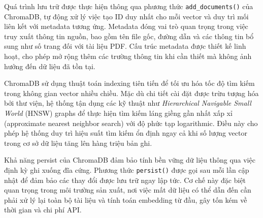 Quá trình lưu trữ được thực hiện thông qua phương thức \texttt{add\_documents()} của ChromaDB, tự động xử lý việc tạo ID duy nhất cho mỗi vector và duy trì mối liên kết với metadata tương ứng. Metadata đóng vai trò quan trọng trong việc truy xuất thông tin nguồn, bao gồm tên file gốc, đường dẫn và các thông tin bổ sung như số trang đối với tài liệu PDF. Cấu trúc metadata được thiết kế linh hoạt, cho phép mở rộng thêm các trường thông tin khi cần thiết mà không ảnh hưởng đến dữ liệu đã tồn tại.

ChromaDB sử dụng thuật toán indexing tiên tiến để tối ưu hóa tốc độ tìm kiếm trong không gian vector nhiều chiều. Mặc dù chi tiết cài đặt được trừu tượng hóa bởi thư viện, hệ thống tận dụng các kỹ thuật như \emph{Hierarchical Navigable Small World} (HNSW) graphs để thực hiện tìm kiếm láng giềng gần nhất xấp xỉ (approximate nearest neighbor search) với độ phức tạp logarithmic. Điều này cho phép hệ thống duy trì hiệu suất tìm kiếm ổn định ngay cả khi số lượng vector trong cơ sở dữ liệu tăng lên hàng triệu bản ghi.

Khả năng persist của ChromaDB đảm bảo tính bền vững dữ liệu thông qua việc định kỳ ghi xuống đĩa cứng. Phương thức \texttt{persist()} được gọi sau mỗi lần cập nhật để đảm bảo các thay đổi được lưu trữ ngay lập tức. Cơ chế này đặc biệt quan trọng trong môi trường sản xuất, nơi việc mất dữ liệu có thể dẫn đến cần phải xử lý lại toàn bộ tài liệu và tính toán embedding từ đầu, gây tốn kém về thời gian và chi phí API.
